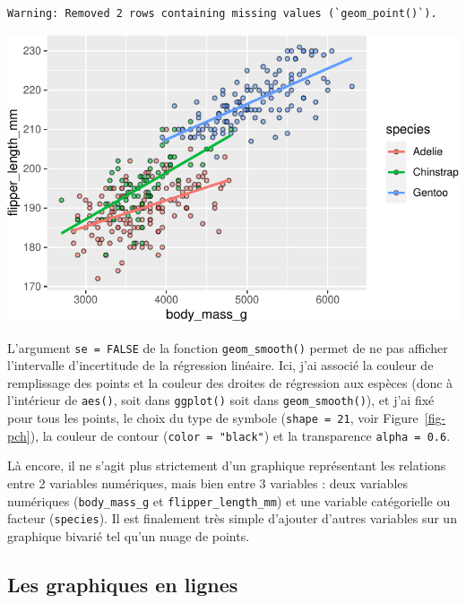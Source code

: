 \documentclass[
  a4paper,
  DIV=11,
  numbers=noendperiod,
  oneside]{scrreprt}
\begin{document}
\begin{verbatim}
Warning: Removed 2 rows containing missing values (`geom_point()`).
\end{verbatim}

\includegraphics{03-visualization_files/figure-pdf/unnamed-chunk-49-1.pdf}

L'argument \texttt{se\ =\ FALSE} de la fonction \texttt{geom\_smooth()}
permet de ne pas afficher l'intervalle d'incertitude de la régression
linéaire. Ici, j'ai associé la couleur de remplissage des points et la
couleur des droites de régression aux espèces (donc à l'intérieur de
\texttt{aes()}, soit dans \texttt{ggplot()} soit dans
\texttt{geom\_smooth()}), et j'ai fixé pour tous les points, le choix du
type de symbole (\texttt{shape\ =\ 21}, voir Figure~\ref{fig-pch}), la
couleur de contour (\texttt{color\ =\ "black"}) et la transparence
\texttt{alpha\ =\ 0.6}.

Là encore, il ne s'agit plus strictement d'un graphique représentant les
relations entre 2 variables numériques, mais bien entre 3 variables :
deux variables numériques (\texttt{body\_mass\_g} et
\texttt{flipper\_length\_mm}) et une variable catégorielle ou facteur
(\texttt{species}). Il est finalement très simple d'ajouter d'autres
variables sur un graphique bivarié tel qu'un nuage de points.

\subsection{Les graphiques en lignes}\label{les-graphiques-en-lignes}
\end{document}
